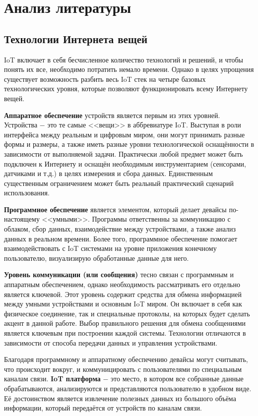 \chapter{Анализ литературы}


	\setcounter{subsection}{-1}
	\section{Технологии Интернета вещей}
	IoT включает в себя бесчисленное количество технологий и решений, и чтобы понять их все, необходимо
	потратить немало времени. Однако в целях упрощения существует возможность разбить весь IoT стек на
	четыре базовых технологических уровня, которые позволяют функционировать всему Интернету вещей.
	
	\textbf{Аппаратное обеспечение} устройств является первым из этих уровней. Устройства $-$ это те самые
	<<вещи>> в аббревиатуре IoT. Выступая в роли интерфейса между реальным и цифровым миром, они
	могут принимать разные формы и размеры, а также иметь разные уровни технологической оснащённости в
	зависимости от выполняемой задачи. Практически любой предмет может быть подключен к Интернету и
	оснащён необходимым инструментарием (сенсорами, датчиками и т.д.) в целях измерения и сбора данных.
	Единственным существенным ограничением может быть реальный практический сценарий использования.
	
	\textbf{Программное обеспечение} является элементом, который делает девайсы по-настоящему <<умными>>.
	Программы ответственны за коммуникацию с облаком, сбор данных, взаимодействие между устройствами,
	а также анализ данных в реальном времени. Более того, программное обеспечение помогает взаимодействовать
	с IoT системами на уровне приложения конечному пользователю, визуализирую обработанные данные для него.
	
	\textbf{Уровень коммуникации (или сообщения)} тесно связан с программным и аппаратным обеспечением, однако
	необходимость рассматривать его отдельно является ключевой. Этот уровень содержит средства для обмена
	информацией между умными устройствами и основным IoT миром. Он включает в себя как физическое соединение,
	так и специальные протоколы, на которых будет сделать акцент в данной работе. Выбор правильного решения
	для обмена сообщениями является ключевым при построении каждой системы. Технологии отличаются в
	зависимости от способа передачи данных и управления устройствами.
	
	Благодаря программному и аппаратному обеспечению девайсы могут считывать, что происходит вокруг, и
	коммуницировать с пользователями по специальным каналам связи. \textbf{IoT платформа} $-$ это место, в котором
	все собранные данные обрабатываются, анализируются и представляются пользователю в удобном виде.
	Её достоинством является извлечение полезных данных из большого объёма информации, который передаётся
	от устройств по каналам связи.
	
